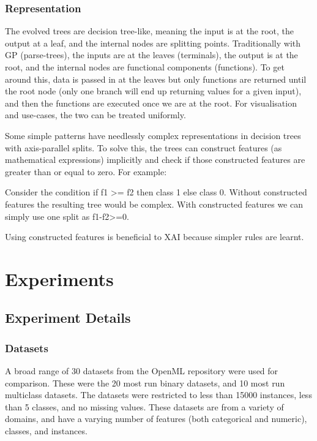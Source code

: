 \subsubsection{Representation}
The evolved trees are decision tree-like, meaning the input is at the root, the output at a leaf, and the internal nodes are splitting points. Traditionally with GP (parse-trees), the inputs are at the leaves (terminals), the output is at the root, and the internal nodes are functional components (functions). To get around this, data is passed in at the leaves but only functions are returned until the root node (only one branch will end up returning values for a given input), and then the functions are executed once we are at the root. For visualisation and use-cases, the two can be treated uniformly. 

Some simple patterns have needlessly complex representations in decision trees with axis-parallel splits. To solve this, the trees can construct features (as mathematical expressions) implicitly and check if those constructed features are greater than or equal to zero. For example: 
\begin{center}
Consider the condition if f1 >= f2 then class 1 else class 0. Without constructed features the resulting tree would be complex. With constructed features we can simply use one split as f1-f2>=0.
\end{center}

Using constructed features is beneficial to XAI because simpler rules are learnt.
\section{Experiments}
\subsection{Experiment Details}
\subsubsection{Datasets}
A broad range of 30 datasets from the OpenML repository \cite{Van:openml} were used for comparison. These were the 20 most run binary datasets, and 10 most run multiclass datasets. The datasets were restricted to less than 15000 instances, less than 5 classes, and no missing values. These datasets are from a variety of domains, and have a varying number of features (both categorical and numeric), classes, and instances.
